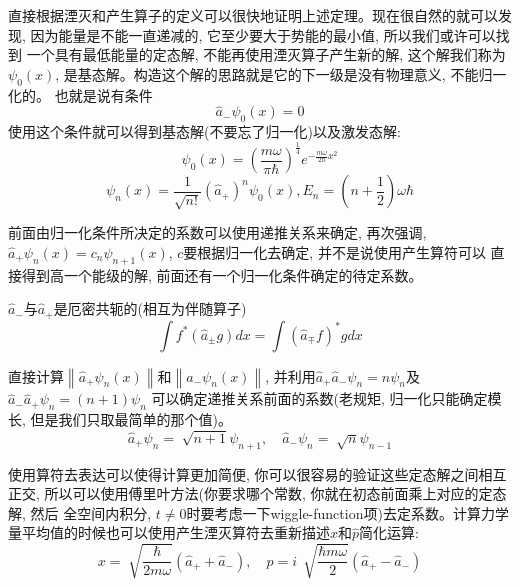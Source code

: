 \documentclass[a4paper,zihao=-4,linespread=1]{ctexrep}
\newenvironment{lequation}{\large\begin{equation}}{\end{equation}}
\begin{document}
    直接根据湮灭和产生算子的定义可以很快地证明上述定理。现在很自然的就可以发现, 因为能量是不能一直递减的, 它至少要大于势能的最小值, 所以我们或许可以找到
    一个具有最低能量的定态解, 不能再使用湮灭算子产生新的解, 这个解我们称为$\psi_0(x)$, 是基态解。构造这个解的思路就是它的下一级是没有物理意义, 不能归一化的。
    也就是说有条件$$\hat{a}_-\psi_0(x)=0$$使用这个条件就可以得到基态解(不要忘了归一化)以及激发态解:
    \begin{lequation}
        \boxed{
            \psi_0(x)=\left(\frac{m\omega}{\pi\hbar}\right)^{\frac{1}{4}}e^{-\frac{m \omega}{2\hbar}x^2}
        }
    \end{lequation}
    \begin{lequation}
        \boxed{
            \psi_n(x)=\frac{1}{\sqrt{n!}}\left(\hat{a}_+\right)^n\psi_0(x),E_n=\left(n+\frac{1}{2}\right)\omega \hbar
        }
    \end{lequation}

    前面由归一化条件所决定的系数可以使用递推关系来确定, 再次强调, $\hat{a}_+\psi_n(x)=c_n\psi_{n+1}(x)$, $c$要根据归一化去确定, 并不是说使用产生算符可以
    直接得到高一个能级的解, 前面还有一个归一化条件确定的待定系数。
    \begin{theorem}{$\hat{a}_-$与$\hat{a}_+$是厄密共轭的(相互为伴随算子)}
        \begin{lequation}
            \int f^*(\hat{a}_\pm g)dx=\int (\hat{a}_\mp f)^* gdx
        \end{lequation}
    \end{theorem}
    直接计算$\left \| \hat{a}_+\psi_n(x) \right \|$和$\left \| \hat{a}_-\psi_n(x) \right \|$, 并利用$\hat{a}_+\hat{a}_-\psi_n=n\psi_n$及$\hat{a}_-\hat{a}_+\psi_n=(n+1)\psi_n$
    可以确定递推关系前面的系数(老规矩, 归一化只能确定模长, 但是我们只取最简单的那个值)。
    \begin{lequation}
        \boxed{
            \hat{a}_+\psi_n=\sqrt[]{n+1}\psi_{n+1},\quad\hat{a}_-\psi_n=\sqrt[]{n}\psi_{n-1}
        }
    \end{lequation}

    使用算符去表达可以使得计算更加简便, 你可以很容易的验证这些定态解之间相互正交, 所以可以使用傅里叶方法(你要求哪个常数, 你就在初态前面乘上对应的定态解, 然后
    全空间内积分, $t\neq0$时要考虑一下wiggle-function项)去定系数。计算力学量平均值的时候也可以使用产生湮灭算符去重新描述$x$和$\hat{p}$简化运算:
    \begin{lequation}
        \boxed{
            x =\sqrt[]{\frac{\hbar}{2m\omega}}\left(\hat{a}_++\hat{a}_-\right), \quad 
            p =i\,\sqrt[]{\frac{\hbar m \omega}{2}}\left(\hat{a}_+-\hat{a}_-\right)
        }
    \end{lequation}
\end{document}
